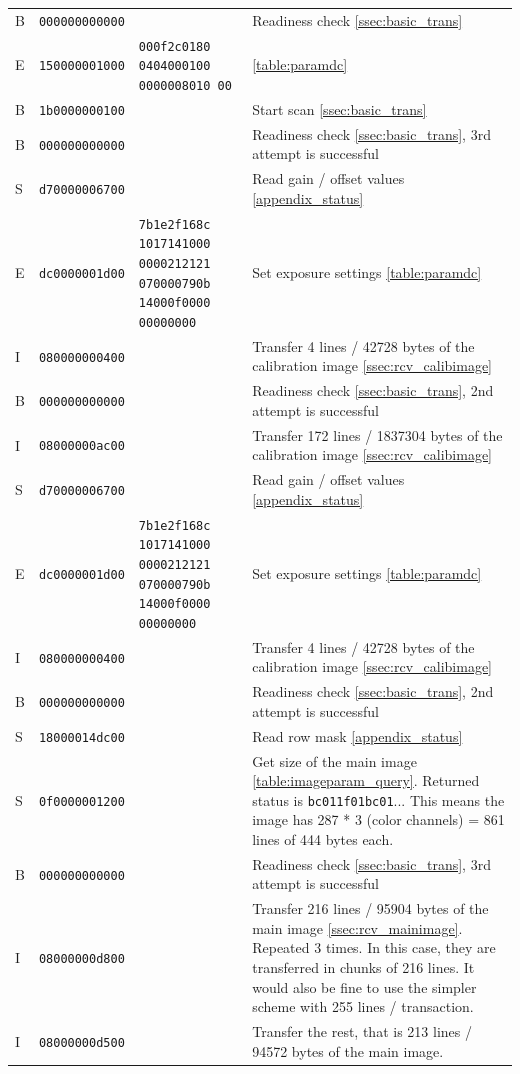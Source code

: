 \documentclass{article}
\begin{document}
\begin{tabularx}{\textwidth}{p{0.2cm}|p{2.3cm}|p{2cm}|X}
  B & {\tt 000000000000} &  & Readiness check \autoref{ssec:basic_trans} \\
  E & {\tt 150000001000} & \tt 000f2c0180 0404000100 0000008010 00 & \autoref{table:paramdc} \\
  B & {\tt 1b0000000100} &  & Start scan \autoref{ssec:basic_trans} \\
  B & {\tt 000000000000} &  & Readiness check \autoref{ssec:basic_trans}, 3rd attempt is successful \\ 
  S & {\tt d70000006700} &  & Read gain / offset values \autoref{appendix_status} \\
  E & {\tt dc0000001d00} & \tt 7b1e2f168c 1017141000 0000212121 070000790b 14000f0000 00000000
                         & Set exposure settings \autoref{table:paramdc} \\
  I & {\tt 080000000400} &  & Transfer 4 lines / 42728 bytes of the calibration image \autoref{ssec:rcv_calibimage} \\
  B & {\tt 000000000000} &  & Readiness check \autoref{ssec:basic_trans}, 2nd attempt is successful \\
  I & {\tt 08000000ac00} &  & Transfer 172 lines / 1837304 bytes of the calibration image \autoref{ssec:rcv_calibimage}  \\
  S & {\tt d70000006700} &  & Read gain / offset values \autoref{appendix_status} \\
  E & {\tt dc0000001d00} & \tt 7b1e2f168c 1017141000 0000212121 070000790b 14000f0000 00000000
                         & Set exposure settings \autoref{table:paramdc} \\
  I & {\tt 080000000400} &  & Transfer 4 lines / 42728 bytes of the calibration image \autoref{ssec:rcv_calibimage} \\
  B & {\tt 000000000000} &  & Readiness check \autoref{ssec:basic_trans}, 2nd attempt is successful \\
  S & {\tt 18000014dc00} &  & Read row mask \autoref{appendix_status} \\
  S & {\tt 0f0000001200} &  & Get size of the main image \autoref{table:imageparam_query}.
                              Returned status is {\tt bc011f01bc01}... This means the
                              image has 287 * 3 (color channels) = 861 lines of 444 bytes each. \\
  B & {\tt 000000000000} &  & Readiness check \autoref{ssec:basic_trans}, 3rd attempt is successful \\
  I & {\tt 08000000d800} &  & Transfer 216 lines / 95904 bytes of the main image \autoref{ssec:rcv_mainimage}.
                              Repeated 3 times.
                              In this case, they are transferred in chunks of 216 lines. It would also
                              be fine to use the simpler scheme with 255 lines / transaction. \\
  I & {\tt 08000000d500} &  & Transfer the rest, that is 213 lines / 94572 bytes of the main image. \\
\end{tabularx}
\end{document}
